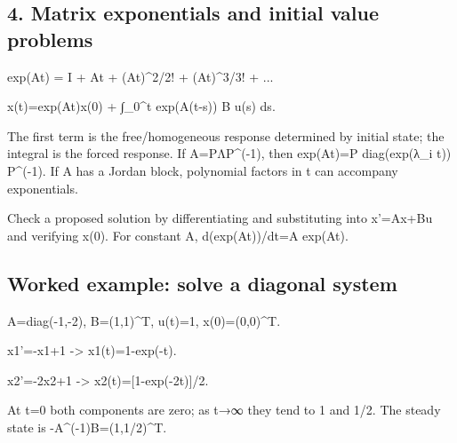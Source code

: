 \documentclass[11pt,a4paper]{article}
\begin{document}
\subsection{4. Matrix exponentials and initial value problems}
\begin{equationbox}\raggedright
{\ttfamily\small exp(At) = I + At + (At)\textasciicircum{}2/2! + (At)\textasciicircum{}3/3! + ...}\par
\end{equationbox}
\begin{equationbox}\raggedright
{\ttfamily\small x(t)=exp(At)x(0) + ∫\_0\textasciicircum{}t exp(A(t-s)) B u(s) ds.}\par
\end{equationbox}
\begin{conceptbox}The first term is the free/homogeneous response determined by initial state; the integral is the forced response. If A=PΛP\textasciicircum{}(-1), then exp(At)=P diag(exp(λ\_i t)) P\textasciicircum{}(-1). If A has a Jordan block, polynomial factors in t can accompany exponentials.\end{conceptbox}
\begin{conceptbox}Check a proposed solution by differentiating and substituting into x'=Ax+Bu and verifying x(0). For constant A, d(exp(At))/dt=A exp(At).\end{conceptbox}

\subsection{Worked example: solve a diagonal system}
\begin{equationbox}\raggedright
{\ttfamily\small A=diag(-1,-2), B=(1,1)\textasciicircum{}T, u(t)=1, x(0)=(0,0)\textasciicircum{}T.}\par
\end{equationbox}
\begin{equationbox}\raggedright
{\ttfamily\small x1'=-x1+1 -> x1(t)=1-exp(-t).}\par
\end{equationbox}
\begin{equationbox}\raggedright
{\ttfamily\small x2'=-2x2+1 -> x2(t)=[1-exp(-2t)]/2.}\par
\end{equationbox}
\begin{conceptbox}At t=0 both components are zero; as t→∞ they tend to 1 and 1/2. The steady state is -A\textasciicircum{}(-1)B=(1,1/2)\textasciicircum{}T.\end{conceptbox}
\end{document}
